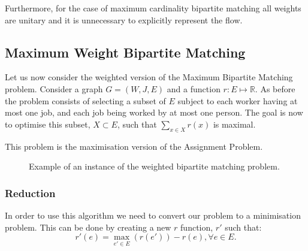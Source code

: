 \documentclass[a4,11pt]{article}
\begin{document}
Furthermore, for the case of maximum cardinality bipartite matching all weights are unitary and it is unnecessary to explicitly represent the flow.

\subsection{Maximum Weight Bipartite Matching}
Let us now consider the weighted version of the Maximum Bipartite Matching problem. Consider a graph $G = (W, J, E)$ and a function $r : E \mapsto \mathbb{R}$. As before the problem consists of selecting a subset of $E$ subject to each worker having at most one job, and each job being worked by at most one person. The goal is now to optimise this subset, $X \subset E$, such that $\sum_{x \in X} r(x)$ is maximal.

This problem is the maximisation version of the Assignment Problem\cite{korte_combinatorial_2012}.

\begin{figure}[ht]
    \centering
    \caption{Example of an instance of the weighted bipartite matching problem.} \label{wightex}
\end{figure}

\subsubsection{Reduction}
In order to use this algorithm we need to convert our problem to a minimisation problem. This can be done by creating a new $r$ function, $r'$ such that:
\[r'(e) = \max_{e' \in E}(r(e')) - r(e), \forall e \in E.\]
\end{document}
